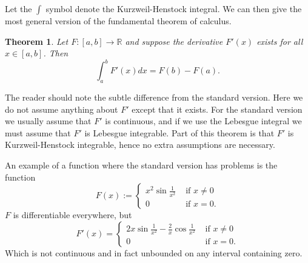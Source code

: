 \documentclass[12pt]{article}
\theoremstyle{theorem}
\newtheorem*{thm}{Theorem}
\theoremstyle{definition}
\theoremstyle{remark}
\begin{document}
Let the $\int$ symbol denote the Kurzweil-Henstock integral.  We can then give the most general version of the fundamental theorem of calculus.

\begin{thm}
Let $F \colon [a,b] \to {\mathbb{R}}$ and suppose the derivative
$F'(x)$ exists for all $x \in [a,b]$.  Then
\begin{equation*}
\int_a^b F'(x) dx = F(b)-F(a) .
\end{equation*}
\end{thm}

The reader should note the subtle difference from the standard version.  Here we do not assume anything about $F'$ except that it exists.  For the standard version we usually assume that $F'$ is continuous, and if we use the Lebesgue integral we must assume that $F'$ is Lebesgue integrable.  Part of this theorem is that $F'$ is Kurzweil-Henstock integrable, hence no extra assumptions are necessary.

An example of a function where the standard version has problems is the function
\begin{equation*}
F(x) :=
\begin{cases}
x^2 \sin \frac{1}{x^2} & \text{ if $x \not= 0$} \\
0 & \text{ if $x = 0$} .
\end{cases}
\end{equation*}
$F$ is differentiable everywhere, but
\begin{equation*}
F'(x) =
\begin{cases}
2x \sin \frac{1}{x^2} - \frac{2}{x}\cos \frac{1}{x^2} & \text{ if $x \not= 0$} \\
0 & \text{ if $x = 0$} .
\end{cases}
\end{equation*}
Which is not continuous and in fact unbounded on any interval containing zero.
\end{document}

